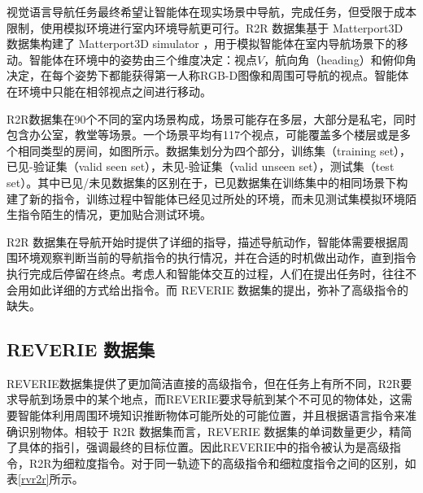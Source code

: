\documentclass[bachelor]{thesis-uestc}
\begin{document}
视觉语言导航任务最终希望让智能体在现实场景中导航，完成任务，但受限于成本限制，使用模拟环境进行室内环境导航更可行。R2R 数据集基于 Matterport3D 数据集构建了 Matterport3D simulator ，用于模拟智能体在室内导航场景下的移动。智能体在环境中的姿势由三个维度决定：视点$V$，航向角（heading）和俯仰角决定，在每个姿势下都能获得第一人称RGB-D图像和周围可导航的视点。智能体在环境中只能在相邻视点之间进行移动。

R2R数据集在90个不同的室内场景构成，场景可能存在多层，大部分是私宅，同时包含办公室，教堂等场景。一个场景平均有117个视点，可能覆盖多个楼层或是多个相同类型的房间，如图所示。数据集划分为四个部分，训练集（training set），已见-验证集（valid seen set），未见-验证集（valid unseen set），测试集（test set）。其中已见/未见数据集的区别在于，已见数据集在训练集中的相同场景下构建了新的指令，训练过程中智能体已经见过所处的环境，而未见测试集模拟环境陌生指令陌生的情况，更加贴合测试环境。


R2R 数据集在导航开始时提供了详细的指导，描述导航动作，智能体需要根据周围环境观察判断当前的导航指令的执行情况，并在合适的时机做出动作，直到指令执行完成后停留在终点。考虑人和智能体交互的过程，人们在提出任务时，往往不会用如此详细的方式给出指令。而 REVERIE 数据集的提出，弥补了高级指令的缺失。

\subsection{REVERIE 数据集}
REVERIE数据集提供了更加简洁直接的高级指令，但在任务上有所不同，R2R要求导航到场景中的某个地点，而REVERIE要求导航到某个不可见的物体处，这需要智能体利用周围环境知识推断物体可能所处的可能位置，并且根据语言指令来准确识别物体。相较于 R2R 数据集而言，REVERIE 数据集的单词数量更少，精简了具体的指引，强调最终的目标位置。因此REVERIE中的指令被认为是高级指令，R2R为细粒度指令。对于同一轨迹下的高级指令和细粒度指令之间的区别，如表\ref{rvr2r}所示。
\end{document}
